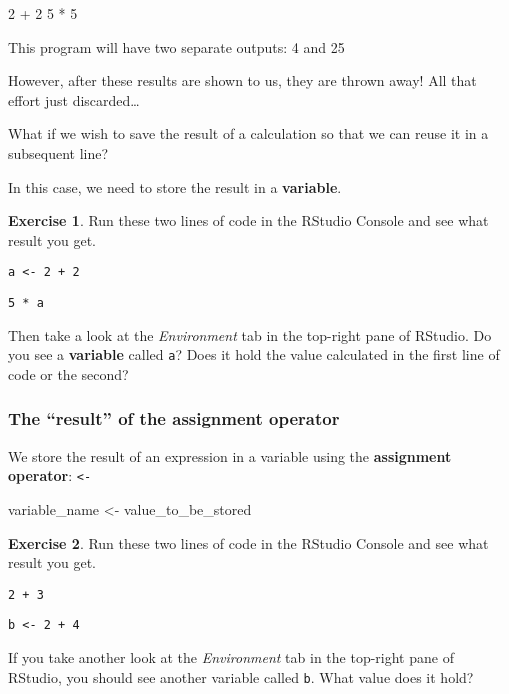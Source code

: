 \documentclass[
]{article}
\newenvironment{Shaded}{\begin{snugshade}}{\end{snugshade}}
\newcommand{\DecValTok}[1]{\textcolor[rgb]{0.00,0.00,0.81}{#1}}
\newcommand{\NormalTok}[1]{#1}
\newcommand{\OtherTok}[1]{\textcolor[rgb]{0.56,0.35,0.01}{#1}}
\newcommand{\SpecialCharTok}[1]{\textcolor[rgb]{0.00,0.00,0.00}{#1}}
\theoremstyle{definition}
\theoremstyle{definition}
\theoremstyle{definition}
\newtheorem{exercise}{Exercise}[section]
\theoremstyle{definition}
\theoremstyle{remark}
\begin{document}
\begin{Shaded}
\begin{Highlighting}[]
\DecValTok{2} \SpecialCharTok{+} \DecValTok{2}
\DecValTok{5} \SpecialCharTok{*} \DecValTok{5}
\end{Highlighting}
\end{Shaded}

This program will have two separate outputs: 4 and 25

However, after these results are shown to us, they are thrown away! All that effort just discarded\ldots{}

What if we wish to save the result of a calculation so that we can reuse it in a subsequent line?

In this case, we need to store the result in a \textbf{variable}.

\begin{exercise}
Run these two lines of code in the RStudio Console and see what result you get.

\texttt{a\ \textless{}-\ 2\ +\ 2}

\texttt{5\ *\ a}

Then take a look at the \emph{Environment} tab in the top-right pane of RStudio.
Do you see a \textbf{variable} called \texttt{a}?
Does it hold the value calculated in the first line of code or the second?
\end{exercise}

\hypertarget{the-result-of-the-assignment-operator}{%
\subsubsection{The ``result'' of the assignment operator}\label{the-result-of-the-assignment-operator}}

We store the result of an expression in a variable using the \textbf{assignment operator}: \texttt{\textless{}-}

\begin{Shaded}
\begin{Highlighting}[]
\NormalTok{variable\_name }\OtherTok{\textless{}{-}}\NormalTok{ value\_to\_be\_stored}
\end{Highlighting}
\end{Shaded}

\begin{exercise}
Run these two lines of code in the RStudio Console and see what result you get.

\texttt{2\ +\ 3}

\texttt{b\ \textless{}-\ 2\ +\ 4}

If you take another look at the \emph{Environment} tab in the top-right pane of RStudio, you should see another variable called \texttt{b}. What value does it hold?
\end{exercise}
\end{document}
